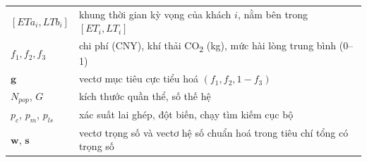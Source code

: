 \begin{longtable}{@{}p{3.2cm}p{11.3cm}@{}}
$[ETa_i, LTb_i]$        & khung thời gian kỳ vọng của khách $i$, nằm bên trong $[ET_i, LT_i]$ \\
$f_1, f_2, f_3$         & chi phí (CNY), khí thải CO\textsubscript{2} (kg), mức hài lòng trung bình (0--1) \\
$\mathbf{g}$            & vectơ mục tiêu cực tiểu hoá $(f_1, f_2, 1-f_3)$ \\
$N_{pop}$, $G$          & kích thước quần thể, số thế hệ \\
$p_c$, $p_m$, $p_{ls}$  & xác suất lai ghép, đột biến, chạy tìm kiếm cục bộ \\
$\mathbf{w}$, $\mathbf{s}$ & vectơ trọng số và vectơ hệ số chuẩn hoá trong tiêu chí tổng có trọng số \\
\bottomrule
\end{longtable}
